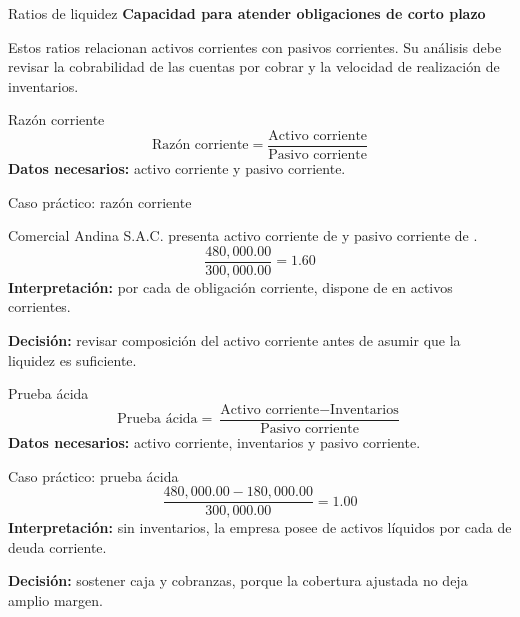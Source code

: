 \begin{frame}{Ratios de liquidez}
\color{liquidez}\textbf{Capacidad para atender obligaciones de corto plazo}\color{black}

\vspace{0.7em}
Estos ratios relacionan activos corrientes con pasivos corrientes. Su análisis debe revisar la cobrabilidad de las cuentas por cobrar y la velocidad de realización de inventarios.
\end{frame}

\begin{frame}{Razón corriente}
\vspace{0.8em}
\[
\text{Razón corriente}=\frac{\text{Activo corriente}}{\text{Pasivo corriente}}
\]
\textbf{Datos necesarios:} activo corriente y pasivo corriente.
\end{frame}

\begin{frame}{Caso práctico: razón corriente}
\casoeducativo

\vspace{0.4em}
Comercial Andina S.A.C. presenta activo corriente de  y pasivo corriente de .
\[
\frac{480,000.00}{300,000.00}=1.60
\]
\textbf{Interpretación:} por cada  de obligación corriente, dispone de  en activos corrientes.

\textbf{Decisión:} revisar composición del activo corriente antes de asumir que la liquidez es suficiente.
\end{frame}

\begin{frame}{Prueba ácida}
\[
\text{Prueba ácida}=\frac{\text{Activo corriente}-\text{Inventarios}}{\text{Pasivo corriente}}
\]
\textbf{Datos necesarios:} activo corriente, inventarios y pasivo corriente.
\end{frame}

\begin{frame}{Caso práctico: prueba ácida}
\casoeducativo
\[
\frac{480,000.00-180,000.00}{300,000.00}=1.00
\]
\textbf{Interpretación:} sin inventarios, la empresa posee  de activos líquidos por cada  de deuda corriente.

\textbf{Decisión:} sostener caja y cobranzas, porque la cobertura ajustada no deja amplio margen.
\end{frame}

